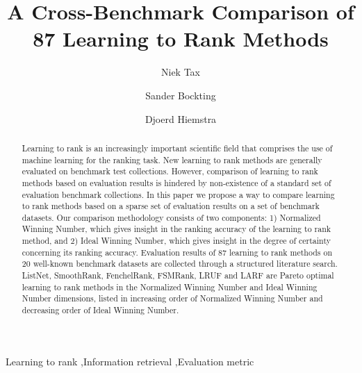 \documentclass[english, authoryear, preprint]{elsarticle}
\begin{document}
\begin{frontmatter}
\title{A Cross-Benchmark Comparison of 87 Learning to Rank Methods}
\author[avanade,tue]{Niek Tax}
\author[avanade]{Sander Bockting}
\author[ut]{Djoerd Hiemstra}
\address[avanade]{Avanade Netherlands B.V., Versterkerstraat 6,
1322AP Almere, the Netherlands}
\address[ut]{University of Twente, P.O. Box 217, 7500AE Enschede,
the Netherlands}
\address[tue]{Eindhoven University of Technology, P.O. Box 513, 5600MB Eindhoven, the Netherlands}
\begin{abstract}
Learning to rank is an increasingly important scientific field that comprises the use of machine learning for the ranking task. New learning to rank methods are generally evaluated on benchmark test collections. However, comparison of learning to rank methods based on evaluation results is hindered by non-existence of a standard set of evaluation benchmark collections. In this paper we propose a way to compare learning to rank methods based on a sparse set of evaluation results on a set of benchmark datasets. Our comparison methodology consists of two components: 1) Normalized Winning Number, which gives insight in the ranking accuracy of the learning to rank method, and 2) Ideal Winning Number, which gives insight in the degree of certainty concerning its ranking accuracy. Evaluation results of 87 learning to rank methods on 20 well-known benchmark datasets are collected through a structured literature search. ListNet, SmoothRank, FenchelRank, FSMRank, LRUF and LARF are Pareto optimal learning to rank methods in the Normalized Winning Number and Ideal Winning Number dimensions, listed in increasing order of Normalized Winning Number and decreasing order of Ideal Winning Number.
\end{abstract}
\begin{keyword}
Learning to rank \sep Information retrieval \sep Evaluation metric
\end{keyword}
\end{frontmatter}
\end{document}
